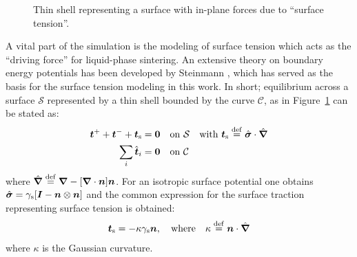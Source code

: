 \documentclass[MikaelDissertation.tex]{subfiles}
\begin{document}
\begin{figure}[th!]
    \centering
    
    \caption{Thin shell representing a surface with in-plane forces due to ``surface tension''.}
    \label{fig:surfacestress}
\end{figure}
A vital part of the simulation is the modeling of surface tension which acts as the ``driving force'' for liquid-phase sintering.
An extensive theory on boundary energy potentials has been developed by Steinmann \cite{steinmann_boundary_2008}, which has served as the basis for the surface tension modeling in this work.
In short; equilibrium across a surface $\mathcal{S}$ represented by a thin shell bounded by the curve $\mathcal{C}$, as in Figure~\ref{fig:surfacestress} can be stated as:
\begin{align}
    \boldsymbol{t}^+ + \boldsymbol{t}^- + \boldsymbol{t}_{\mathrm{s}} &= \boldsymbol{0} \quad \text{on} \,\, \mathcal{S} \quad \text{with } \boldsymbol{t}_{\mathrm{s}} \overset{\mathrm{def}}{=} \hat{\boldsymbol{\sigma}}\cdot\hat{\boldsymbol{\nabla}}
\label{eq103KR}\\
    \sum_i \hat{\boldsymbol{t}}_i &= \boldsymbol{0} \quad \text{on} \,\, \mathcal{C}
\label{eq104KR}
\end{align}
where $\hat{\boldsymbol{\nabla}} \overset{\mathrm{def}}{=} \boldsymbol{\nabla} - [\boldsymbol{\nabla}\cdot\boldsymbol{n}]\boldsymbol{n}$.
For an isotropic surface potential one obtains $\hat{\boldsymbol{\sigma}} = \gamma_{\mathrm{s}}[\boldsymbol{I}-\boldsymbol{n}\mathbin{\otimes}\boldsymbol{n}]$ and the common expression for the surface traction representing surface tension is obtained:
\begin{align}
 \boldsymbol{t}_{\mathrm{s}} = -\kappa \gamma_{\mathrm{s}} \boldsymbol{n},\quad \text{where}\quad \kappa \overset{\mathrm{def}}{=} \boldsymbol{n}\cdot\hat{\boldsymbol{\nabla}}
\end{align}
where $\kappa$ is the Gaussian curvature.


\end{document}

